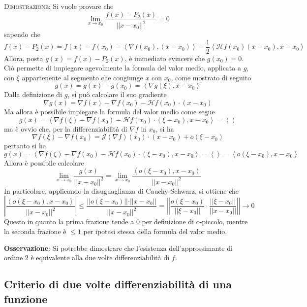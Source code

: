 \documentclass[a4paper]{extarticle}
\begin{document}
\vspace{2em}
\noindent
\normalfont \normalsize
\textsc{Dimostrazione}: Si vuole provare che
\[\lim_{x \to x_0} \dfrac{f(x) - P_2(x)}{\vert \vert x-x_0 \vert \vert^2} = 0\]
sapendo che
\[f(x)-P_2(x) = f(x) - f(x_0) - \left<\nabla f(x_0), (x-x_0)\right> - \dfrac{1}{2} \left<\mathcal{H} f(x_0) (x-x_0), x-x_0\right>\]
Allora, posta $g(x)=f(x)-P_2(x)$, è immediato evincere che $g(x_0)=0$. Ciò permette di impiegare agevolmente la formula del valor medio, applicata a $g$, con $\xi$ appartenente al segmento che congiunge $x$ con $x_0$, come mostrato di seguito
\[g(x)=g(x)-g(x_0)=\left<\nabla g(\xi), x-x_0\right>\]
Dalla definizione di $g$, si può calcolare il suo gradiente
\[\nabla g(x) = \nabla f(x) - \nabla f(x_0) - \mathcal{H}f(x_0) \cdot (x-x_0)\]
Ma allora è possibile impiegare la formula del valor medio come segue
\[g(x)=\left<\nabla f(\xi) - \nabla f(x_0) - \mathcal{H}f(x_0) \cdot (\xi-x_0), x-x_0\right>=\left<\right>\]
ma è ovvio che, per la differenziabilità di $\nabla f$ in $x_0$, si ha
\[\nabla f(\xi) - \nabla f(x_0) = \mathcal{J}(\nabla f)(x_0) \cdot (x-x_0) + o(\xi-x_0)\]
pertanto si ha
\[g(x)=\left<\nabla f(\xi) - \nabla f(x_0) - \mathcal{H}f(x_0) \cdot (\xi-x_0), x-x_0\right>=\left<\right> = \left<o(\xi-x_0),x-x_0\right>\]
Allora è possibile calcolare
\[\lim_{x \to x_0} \dfrac{g(x)}{\vert \vert x - x_0 \vert \vert^2} = \lim_{x \to x_0} \dfrac{\left<o(\xi-x_0),x-x_0\right>}{\vert \vert x-x_0 \vert \vert^2}\]
In particolare, applicando la disuguaglianza di Cauchy-Schwarz, si ottiene che
\[\left \vert \dfrac{\left<o(\xi-x_0),x-x_0\right>}{\vert \vert x-x_0 \vert \vert^2} \right \vert \leq \dfrac{\vert \vert o(\xi-x_0) \vert \vert \cdot \vert \vert x-x_0 \vert \vert}{\vert \vert x-x_0 \vert \vert^2} = \left \vert \left \vert \dfrac{o(\xi-x_0)}{\vert \vert \xi-x_0 \vert \vert} \cdot \dfrac{\vert \vert \xi - x_0 \vert \vert}{\vert \vert x-x_0 \vert \vert} \right \vert \right \vert \to 0\]
Questo in quanto la prima frazione tende a $0$ per definizione di o-piccolo, mentre la seconda frazione è $\leq 1$ per ipotesi stessa della formula del valor medio.

\vspace{1em}
\noindent
\textbf{Osservazione}: Si potrebbe dimostrare che l'esistenza dell'approssimante di ordine $2$ è equivalente alla due volte differenziabilità di $f$.

\vspace{1em}
\noindent
\subsection{Criterio di due volte differenziabilità di una funzione}
\end{document}
